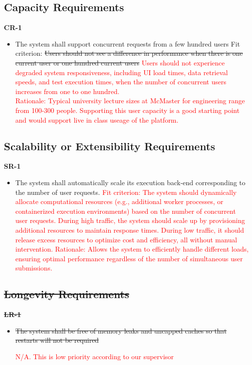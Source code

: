 \documentclass[12pt]{article}
\begin{document}
\subsection{Capacity Requirements}
\textbf{CR-1}
\begin{itemize}
    \item The system shall support concurrent requests from a few hundred users \hfill \break
    Fit criterion: \sout{Users should not see a difference in performance when there is one current user or one hundred current users} \textcolor{red}{Users should not experience degraded system responsiveness, including UI load times, data retrieval speeds, and test execution times, when the number of concurrent users increases from one to one hundred.} \\
    \textcolor{red} {Rationale: Typical university lecture sizes at McMaster for engineering range from 100-300 people. Supporting this user capacity is a good starting point and would support live in class useage of the platform.}
\end{itemize}

\subsection{Scalability or Extensibility Requirements}
\textbf{SR-1}
\begin{itemize}
    \item The system shall automatically scale its execution back-end corresponding to the number of user requests. \hfill \break
    \textcolor{red} {Fit criterion: The system should dynamically allocate computational resources (e.g., additional worker processes, or containerized execution environments) based on the number of concurrent user requests. During high traffic, the system should scale up by provisioning additional resources to maintain response times. During low traffic, it should release excess resources to optimize cost and efficiency, all without manual intervention.} \hfill \break
    \textcolor{red} {Rationale: Allows the system to efficiently handle different loads, ensuring optimal performance regardless of the number of simultaneous user submissions.}
\end{itemize}

\subsection{\sout{Longevity Requirements}}
\textbf{\sout{LR-1}}
\begin{itemize}
    \item \sout{The system shall be free of memory leaks and uncapped caches so that restarts will not be required}

    \textcolor{red}{N/A. This is low priority according to our supervisor}
\end{itemize}
\end{document}
